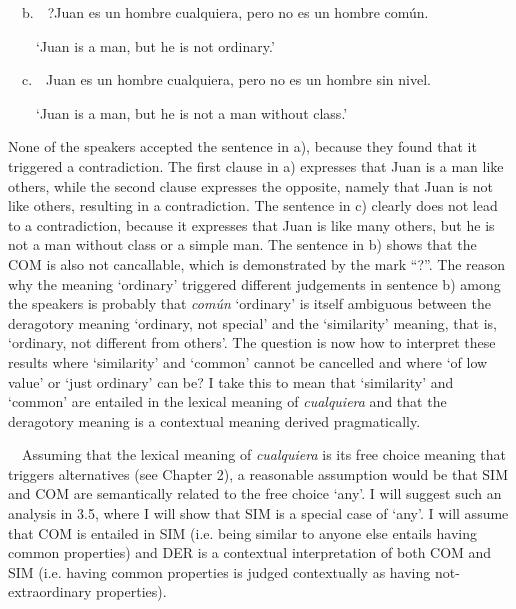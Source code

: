 \begin{styleStandard}
\ \ b.\ \ ?Juan es un hombre cualquiera, pero no es un hombre común.
\end{styleStandard}

\begin{styleStandard}
\ \ \ \ ‘Juan is a man, but he is not ordinary.’
\end{styleStandard}

\begin{styleStandard}
\ \ c.\ \ Juan es un hombre cualquiera, pero no es un hombre sin nivel.
\end{styleStandard}

\begin{styleStandard}
\ \ \ \ ‘Juan is a man, but he is not a man without class.’
\end{styleStandard}

\begin{styleStandard}
None of the speakers accepted the sentence in a), because they found that it triggered a contradiction. The first clause in a) expresses that Juan is a man like others, while the second clause expresses the opposite, namely that Juan is not like others, resulting in a contradiction. The sentence in c) clearly does not lead to a contradiction, because it expresses that Juan is like many others, but he is not a man without class or a simple man. The sentence in b) shows that the COM is also not cancallable, which is demonstrated by the mark “?”. The reason why the meaning ‘ordinary’ triggered different judgements in sentence b) among the speakers is probably that \textit{común} ‘ordinary’ is itself ambiguous between the deragotory meaning ‘ordinary, not special’ and the ‘similarity’ meaning, that is, ‘ordinary, not different from others’. The question is now how to interpret these results where ‘similarity’ and ‘common’ cannot be cancelled and where ‘of low value’ or ‘just ordinary’ can be? I take this to mean that ‘similarity’ and ‘common’ are entailed in the lexical meaning of \textit{cualquiera} and that the deragotory meaning is a contextual meaning derived pragmatically.
\end{styleStandard}

\begin{styleStandard}
\ \ Assuming that the lexical meaning of \textit{cualquiera} is its free choice meaning that triggers alternatives (see Chapter 2), a reasonable assumption would be that SIM and COM are semantically related to the free choice ‘any’. I will suggest such an analysis in 3.5, where I will show that SIM is a special case of ‘any’. I will assume that COM is entailed in SIM (i.e. being similar to anyone else entails having common properties) and DER is a contextual interpretation of both COM and SIM (i.e. having common properties is judged contextually as having not-extraordinary properties).
\end{styleStandard}

